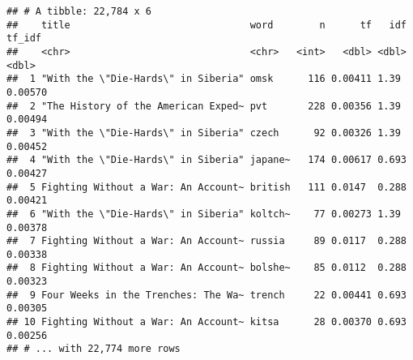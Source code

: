 \documentclass[]{article}
\newenvironment{Shaded}{\begin{snugshade}}{\end{snugshade}}
\newcommand{\DataTypeTok}[1]{\textcolor[rgb]{0.13,0.29,0.53}{#1}}
\newcommand{\DecValTok}[1]{\textcolor[rgb]{0.00,0.00,0.81}{#1}}
\newcommand{\KeywordTok}[1]{\textcolor[rgb]{0.13,0.29,0.53}{\textbf{#1}}}
\newcommand{\NormalTok}[1]{#1}
\newcommand{\OperatorTok}[1]{\textcolor[rgb]{0.81,0.36,0.00}{\textbf{#1}}}
\newcommand{\OtherTok}[1]{\textcolor[rgb]{0.56,0.35,0.01}{#1}}
\newcommand{\StringTok}[1]{\textcolor[rgb]{0.31,0.60,0.02}{#1}}
\begin{document}
\begin{verbatim}
## # A tibble: 22,784 x 6
##    title                               word        n      tf   idf  tf_idf
##    <chr>                               <chr>   <int>   <dbl> <dbl>   <dbl>
##  1 "With the \"Die-Hards\" in Siberia" omsk      116 0.00411 1.39  0.00570
##  2 "The History of the American Exped~ pvt       228 0.00356 1.39  0.00494
##  3 "With the \"Die-Hards\" in Siberia" czech      92 0.00326 1.39  0.00452
##  4 "With the \"Die-Hards\" in Siberia" japane~   174 0.00617 0.693 0.00427
##  5 Fighting Without a War: An Account~ british   111 0.0147  0.288 0.00421
##  6 "With the \"Die-Hards\" in Siberia" koltch~    77 0.00273 1.39  0.00378
##  7 Fighting Without a War: An Account~ russia     89 0.0117  0.288 0.00338
##  8 Fighting Without a War: An Account~ bolshe~    85 0.0112  0.288 0.00323
##  9 Four Weeks in the Trenches: The Wa~ trench     22 0.00441 0.693 0.00305
## 10 Fighting Without a War: An Account~ kitsa      28 0.00370 0.693 0.00256
## # ... with 22,774 more rows
\end{verbatim}

\begin{Shaded}
\end{Shaded}
\end{document}
